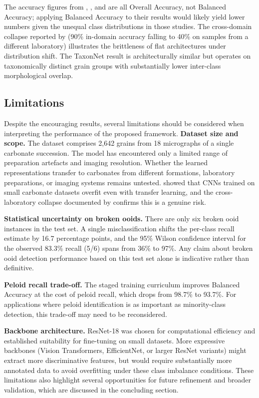 \documentclass[a4paper,fleqn]{cas-dc}
\begin{document}
The accuracy figures from \citet{pireslima2020}, \citet{ho2023}, and \citet{liudunham2023} are all Overall Accuracy, not Balanced Accuracy; applying Balanced Accuracy to their results would likely yield lower numbers given the unequal class distributions in those studies. The cross-domain collapse reported by \citet{pireslima2020} (90\% in-domain accuracy falling to 40\% on samples from a different laboratory) illustrates the brittleness of flat architectures under distribution shift. The TaxonNet result \citep{ho2023} is architecturally similar but operates on taxonomically distinct grain groups with substantially lower inter-class morphological overlap.

\subsection{Limitations}
Despite the encouraging results, several limitations should be considered when interpreting the performance of the proposed framework.
\textbf{Dataset size and scope.} The dataset comprises 2,642 grains from 18 micrographs of a single carbonate succession. The model has encountered only a limited range of preparation artefacts and imaging resolution. Whether the learned representations transfer to carbonates from different formations, laboratory preparations, or imaging systems remains untested. \citet{dawson2023dataset} showed that CNNs trained on small carbonate datasets overfit even with transfer learning, and the cross-laboratory collapse documented by \citet{pireslima2020} confirms this is a genuine risk.

\textbf{Statistical uncertainty on broken ooids.} There are only six broken ooid instances in the test set. A single misclassification shifts the per-class recall estimate by 16.7 percentage points, and the 95\% Wilson confidence interval for the observed 83.3\% recall (5/6) spans from 36\% to 97\%. Any claim about broken ooid detection performance based on this test set alone is indicative rather than definitive.

\textbf{Peloid recall trade-off.} The staged training curriculum improves Balanced Accuracy at the cost of peloid recall, which drops from 98.7\% to 93.7\%. For applications where peloid identification is as important as minority-class detection, this trade-off may need to be reconsidered.

\textbf{Backbone architecture.} ResNet-18 was chosen for computational efficiency and established suitability for fine-tuning on small datasets. More expressive backbones (Vision Transformers, EfficientNet, or larger ResNet variants) might extract more discriminative features, but would require substantially more annotated data to avoid overfitting under these class imbalance conditions. These limitations also highlight several opportunities for future refinement and broader validation, which are discussed in the concluding section.
\end{document}
